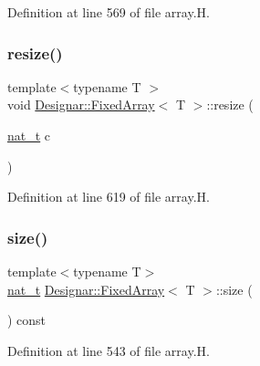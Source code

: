 Definition at line 569 of file array.\+H.

\mbox{\label{class_designar_1_1_fixed_array_af52fca1277e52d28ce6d46ed4a7b471e}} 
\subsubsection{\texorpdfstring{resize()}{resize()}}
{\footnotesize\ttfamily template$<$typename T $>$ \\
void \hyperlink{class_designar_1_1_fixed_array}{Designar\+::\+Fixed\+Array}$<$ T $>$\+::resize (\begin{DoxyParamCaption}\item[{\hyperlink{namespace_designar_aa72662848b9f4815e7bf31a7cf3e33d1}{nat\+\_\+t}}]{c }\end{DoxyParamCaption})}



Definition at line 619 of file array.\+H.

\mbox{\label{class_designar_1_1_fixed_array_a03ce71d0cc8f4155f117bbfe83bb95e8}} 
\subsubsection{\texorpdfstring{size()}{size()}}
{\footnotesize\ttfamily template$<$typename T$>$ \\
\hyperlink{namespace_designar_aa72662848b9f4815e7bf31a7cf3e33d1}{nat\+\_\+t} \hyperlink{class_designar_1_1_fixed_array}{Designar\+::\+Fixed\+Array}$<$ T $>$\+::size (\begin{DoxyParamCaption}{ }\end{DoxyParamCaption}) const\hspace{0.3cm}{\ttfamily [inline]}}



Definition at line 543 of file array.\+H.

\mbox{\label{class_designar_1_1_fixed_array_ab13ae0d1146e753d3e1128e1cce07d91}} 
